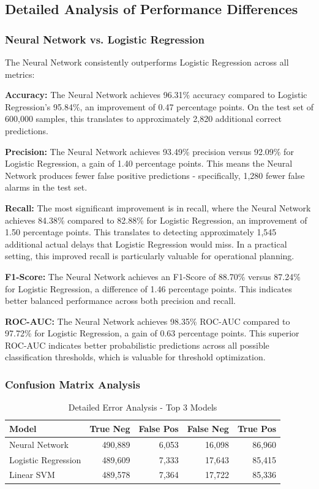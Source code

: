 \documentclass[sigconf]{acmart}
\begin{document}
\subsection{Detailed Analysis of Performance Differences}

\subsubsection{Neural Network vs. Logistic Regression}

The Neural Network consistently outperforms Logistic Regression across all metrics:

\textbf{Accuracy:} The Neural Network achieves 96.31\% accuracy compared to Logistic Regression's 95.84\%, an improvement of 0.47 percentage points. On the test set of 600,000 samples, this translates to approximately 2,820 additional correct predictions.

\textbf{Precision:} The Neural Network achieves 93.49\% precision versus 92.09\% for Logistic Regression, a gain of 1.40 percentage points. This means the Neural Network produces fewer false positive predictions - specifically, 1,280 fewer false alarms in the test set.

\textbf{Recall:} The most significant improvement is in recall, where the Neural Network achieves 84.38\% compared to 82.88\% for Logistic Regression, an improvement of 1.50 percentage points. This translates to detecting approximately 1,545 additional actual delays that Logistic Regression would miss. In a practical setting, this improved recall is particularly valuable for operational planning.

\textbf{F1-Score:} The Neural Network achieves an F1-Score of 88.70\% versus 87.24\% for Logistic Regression, a difference of 1.46 percentage points. This indicates better balanced performance across both precision and recall.

\textbf{ROC-AUC:} The Neural Network achieves 98.35\% ROC-AUC compared to 97.72\% for Logistic Regression, a gain of 0.63 percentage points. This superior ROC-AUC indicates better probabilistic predictions across all possible classification thresholds, which is valuable for threshold optimization.

\subsubsection{Confusion Matrix Analysis}

\begin{table}[h]
\centering
\caption{Detailed Error Analysis - Top 3 Models}
\begin{tabular}{lrrrr}
\toprule
Model & True Neg & False Pos & False Neg & True Pos \\
\midrule
Neural Network & 490,889 & 6,053 & 16,098 & 86,960 \\
Logistic Regression & 489,609 & 7,333 & 17,643 & 85,415 \\
Linear SVM & 489,578 & 7,364 & 17,722 & 85,336 \\
\bottomrule
\end{tabular}
\end{table}
\end{document}
